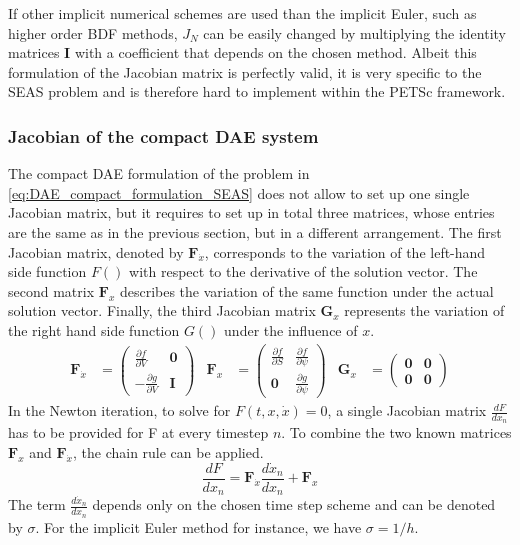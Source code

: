 \documentclass{report}
\begin{document}
If other implicit numerical schemes are used than the implicit Euler, such as higher order BDF methods, $J_N$ can be easily changed by multiplying the identity matrices $\mathbf{I}$ with a coefficient that depends on the chosen method. Albeit this formulation of the Jacobian matrix is perfectly valid, it is very specific to the SEAS problem and is therefore hard to implement within the PETSc framework. 

\subsubsection{Jacobian of the compact DAE system}
The compact DAE formulation of the problem in \autoref{eq:DAE_compact_formulation_SEAS} does not allow to set up one single Jacobian matrix, but it requires to set up in total three matrices, whose entries are the same as in the previous section, but in a different arrangement. The first Jacobian matrix, denoted by $\mathbf{F}_{\dot{x}}$, corresponds to the variation of the left-hand side function $F()$ with respect to the derivative of the solution vector. The second matrix $\mathbf{F}_x$ describes the variation of the same function under the actual solution vector. Finally, the third Jacobian matrix $\mathbf{G}_x$ represents the variation of the right hand side function $G()$ under the influence of $x$.
\begin{align}
	\mathbf{F}_{\dot{x}}&=  \begin{pmatrix}
								\frac{\partial f}{\partial V} & \mathbf{0} \\
							   -\frac{\partial g}{\partial V} & \mathbf{I}
							\end{pmatrix} & 
	\mathbf{F}_x        &=  \begin{pmatrix}
								\frac{\partial f}{\partial S} & \frac{\partial f}{\partial \psi} \\
								\mathbf{0}                    & \frac{\partial g}{\partial \psi}
							\end{pmatrix} & 
	\mathbf{G}_x        &=  \begin{pmatrix}
								\mathbf{0} & \mathbf{0} \\
							    \mathbf{0} & \mathbf{0}
							\end{pmatrix}
\end{align}
In the Newton iteration, to solve for $F(t,x,\dot{x}) = 0$, a single Jacobian matrix $\frac{dF}{dx_n}$ has to be provided for F at every timestep $n$. To combine the two known matrices $\mathbf{F}_x$ and $\mathbf{F}_{\dot{x}}$, the chain rule can be applied.
\begin{equation}
	\frac{dF}{dx_n} = \mathbf{F}_{\dot{x}}\frac{d\dot{x}_n}{dx_n} + \mathbf{F}_x
\end{equation}
The term $\frac{d\dot{x}_n}{dx_n}$ depends only on the chosen time step scheme and can be denoted by $\sigma$. For the implicit Euler method for instance, we have $\sigma = 1/h$.
\end{document}
